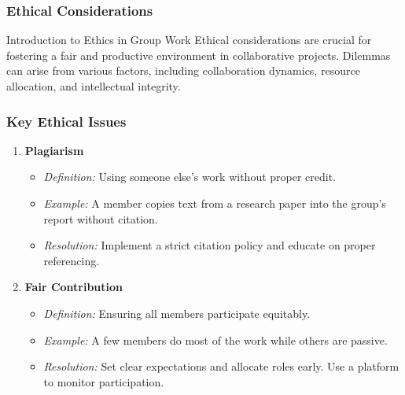 \documentclass[aspectratio=169]{beamer}
\begin{document}
\begin{frame}[fragile]
    \frametitle{Ethical Considerations}
    \begin{block}{Introduction to Ethics in Group Work}
        Ethical considerations are crucial for fostering a fair and productive environment in collaborative projects. Dilemmas can arise from various factors, including collaboration dynamics, resource allocation, and intellectual integrity.
    \end{block}
\end{frame}

\begin{frame}[fragile]
    \frametitle{Key Ethical Issues}
    \begin{enumerate}
        \item \textbf{Plagiarism}
        \begin{itemize}
            \item \textit{Definition:} Using someone else’s work without proper credit.
            \item \textit{Example:} A member copies text from a research paper into the group’s report without citation.
            \item \textit{Resolution:} Implement a strict citation policy and educate on proper referencing.
        \end{itemize}

        \item \textbf{Fair Contribution}
        \begin{itemize}
            \item \textit{Definition:} Ensuring all members participate equitably.
            \item \textit{Example:} A few members do most of the work while others are passive.
            \item \textit{Resolution:} Set clear expectations and allocate roles early. Use a platform to monitor participation.
        \end{itemize}
    \end{enumerate}
\end{frame}
\end{document}
